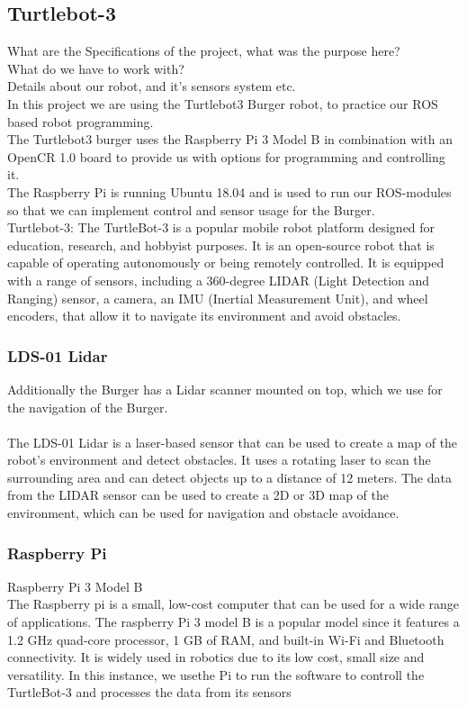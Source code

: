 \documentclass{article}
\begin{document}
\subsection*{Turtlebot-3}
What are the Specifications of the project, what was the purpose here?\\
What do we have to work with?\\
Details about our robot, and it's sensors system etc.\\

In this project we are using the Turtlebot3 Burger robot, to practice our ROS based robot programming.\\
The Turtlebot3 burger uses the Raspberry Pi 3 Model B in combination with an OpenCR 1.0 board to 
provide us with options for programming and controlling it. \\
The Raspberry Pi is running Ubuntu 18.04 and is used to run our ROS-modules so that we can 
implement control and sensor usage for the Burger.\\
Turtlebot-3: The TurtleBot-3 is a popular mobile robot platform designed for education, research, and hobbyist purposes.
It is an open-source robot that is capable of operating autonomously or being remotely controlled.
It is equipped with a range of sensors, including a 360-degree LIDAR (Light Detection and Ranging) sensor, 
a camera, an IMU (Inertial Measurement Unit), and wheel encoders, that allow it to navigate its environment and avoid obstacles.
\\

\subsubsection*{LDS-01 Lidar}
Additionally the Burger has a Lidar scanner mounted on top, which we use for the navigation of the Burger.\\
\\
The LDS-01 Lidar is a laser-based sensor that can be used to create a map of the robot's environment
and detect obstacles. It uses a rotating laser to scan the surrounding area and can detect objects up to a
distance of 12 meters. The data from the LIDAR sensor can be used to create a 2D or 3D map of the environment,
which can be used for navigation and obstacle avoidance.\\

\subsubsection*{Raspberry Pi}
Raspberry Pi 3 Model B\\
The Raspberry pi is a small, low-cost computer that can be used for a wide range of applications. The raspberry Pi 3 model B 
is a popular model since it features a 1.2 GHz quad-core processor, 1 GB of RAM, and built-in Wi-Fi and Bluetooth connectivity.
It is widely used in robotics due to its low cost, small size and versatility. In this instance, we usethe Pi to run the software to controll the TurtleBot-3 
and processes the data from its sensors
\end{document}
